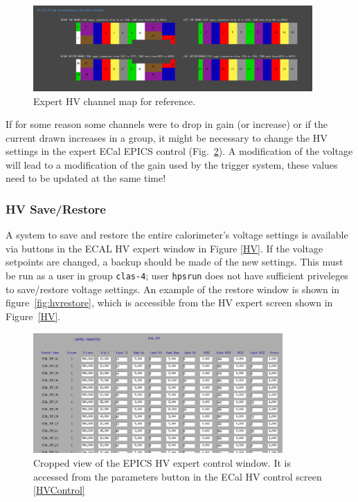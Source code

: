\documentclass[12pt]{article}
\begin{document}
\begin{figure}[htbp]
\center
\includegraphics[width=0.95\textwidth]{pics/ecalhv_expertmap_2014_12_15.png}
\caption{ \label{ExpertMap} Expert HV channel map for reference.}
\end{figure}

      If for some reason some channels were to drop in gain (or increase) or if the current drawn increases in a group, it might be necessary to change the HV settings in the expert ECal EPICS control (Fig.~\ref{EHV}). A modification of the voltage will lead to a modification of the gain used by the trigger system, these values need to be updated at the same time!
    
      \subsubsection{HV Save/Restore}
      A system to save and restore the entire calorimeter's voltage settings is available via buttons in the ECAL HV expert window in Figure \ref{HV}.  If the voltage setpoints are changed, a backup should be made of the new settings.  This must be run as a user in group \texttt{clas-4};  user \texttt{hpsrun} does not have sufficient priveleges to save/restore voltage settings. 
      An example of the restore window is shown in figure~\ref{fig:hvrestore}, which is accessible from the HV expert screen shown in Figure~\ref{HV}.

\begin{figure}[htbp] \centering
\includegraphics[width=0.85\textwidth]{pics/ecalhv_parameters_2014_12_15.png}
\caption{ \label{EHV} Cropped view of the EPICS HV expert control window. It is accessed from the parameters button in the ECal HV control screen \ref{HVControl}}
\end{figure}
\end{document}
